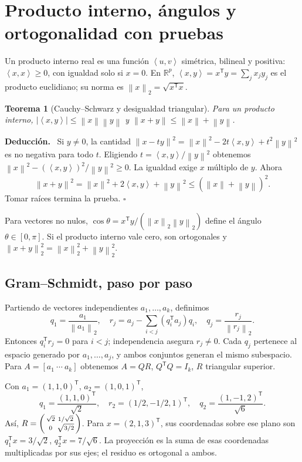 \documentclass[11pt,a4paper]{article}
\newcommand{\R}{\mathbb R}
\newcommand{\T}{^{\mathsf T}}
\newcommand{\norm}[1]{\left\lVert #1\right\rVert}
\newcommand{\ip}[2]{\left\langle #1,#2\right\rangle}
\newenvironment{deduccion}{\par\textbf{Deducción.}\ }{\hfill$\square$\par}
\newtheorem{teorema}{Teorema}[section]
\theoremstyle{definition}
\begin{document}
\section{Producto interno, ángulos y ortogonalidad con pruebas}
Un producto interno real es una función $\ip uv$ simétrica, bilineal y positiva: $\ip xx\ge0$, con igualdad solo si $x=0$. En $\R^p$, $\ip xy=x\T y=\sum_jx_jy_j$ es el producto euclidiano; su norma es $\norm x_2=\sqrt{x\T x}$.
\begin{teorema}[Cauchy--Schwarz y desigualdad triangular]
Para un producto interno, $|\ip xy|\le\norm x\norm y$ y $\norm{x+y}\le\norm x+\norm y$.
\end{teorema}
\begin{deduccion}
Si $y\ne0$, la cantidad $\norm{x-ty}^2=\norm x^2-2t\ip xy+t^2\norm y^2$ es no negativa para todo $t$. Eligiendo $t=\ip xy/\norm y^2$ obtenemos $\norm x^2-(\ip xy)^2/\norm y^2\ge0$. La igualdad exige $x$ múltiplo de $y$. Ahora
\[
\norm{x+y}^2=\norm x^2+2\ip xy+\norm y^2
\le(\norm x+\norm y)^2.
\]
Tomar raíces termina la prueba.
\end{deduccion}
Para vectores no nulos, $\cos\theta=x\T y/(\norm x_2\norm y_2)$ define el ángulo $\theta\in[0,\pi]$. Si el producto interno vale cero, son ortogonales y $\norm{x+y}_2^2=\norm x_2^2+\norm y_2^2$.
\subsection{Gram--Schmidt, paso por paso}
Partiendo de vectores independientes $a_1,\ldots,a_k$, definimos
\[
q_1=\frac{a_1}{\norm{a_1}_2},\quad
r_j=a_j-\sum_{i<j}(q_i\T a_j)q_i,\quad q_j=\frac{r_j}{\norm{r_j}_2}.
\]
Entonces $q_i\T r_j=0$ para $i<j$; independencia asegura $r_j\ne0$. Cada $q_j$ pertenece al espacio generado por $a_1,\ldots,a_j$, y ambos conjuntos generan el mismo subespacio. Para $A=[a_1\ \cdots\ a_k]$ obtenemos $A=QR$, $Q\T Q=I_k$, $R$ triangular superior.
\begin{ejemplo}
Con $a_1=(1,1,0)\T$, $a_2=(1,0,1)\T$,
\[
q_1=\frac{(1,1,0)\T}{\sqrt2},\quad
r_2=(1/2,-1/2,1)\T,\quad
q_2=\frac{(1,-1,2)\T}{\sqrt6}.
\]
Así, $R=\begin{psmallmatrix}\sqrt2&1/\sqrt2\\0&\sqrt{3/2}\end{psmallmatrix}$. Para $x=(2,1,3)\T$, sus coordenadas sobre ese plano son $q_1\T x=3/\sqrt2$, $q_2\T x=7/\sqrt6$. La proyección es la suma de esas coordenadas multiplicadas por sus ejes; el residuo es ortogonal a ambos.
\end{ejemplo}
\end{document}
